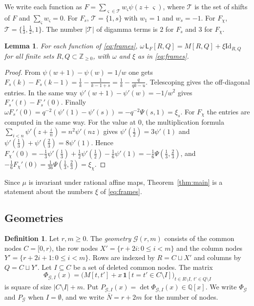 \documentclass[11pt]{amsart}
\newtheorem{lemma}[theorem]{Lemma}
\theoremstyle{definition}
\newtheorem{definition}[theorem]{Definition}
\theoremstyle{remark}
\numberwithin{equation}{section}
\newcommand{\Z}{\mathbb Z}
\newcommand{\Q}{\mathbb Q}
\newcommand{\Lw}{\mathsf L}          %
\newcommand{\Id}{\mathrm{Id}}
\begin{document}
We write each function as $F=\sum_{\varsigma\in\mathcal T}w_\varsigma\psi(z+\varsigma)$, where $\mathcal T$ is the set of
shifts of $F$ and $\sum_\varsigma w_\varsigma=0$. For $F_s$, $\mathcal T=\{1,s\}$ with $w_1=1$ and $w_s=-1$. For
$F_\chi$, $\mathcal T=\{\frac13,\frac12,1\}$. The number $|\mathcal T|$ of digamma terms is $2$ for $F_s$ and $3$ for
$F_\chi$.

\begin{lemma}\label{lem:loewner}
For each function of \eqref{eq:frames}, $\omega\,\Lw_F[R,Q]=M[R,Q]+\xi\Id_{R,Q}$ for all finite sets
$R,Q\subset\Z_{\ge0}$, with $\omega$ and $\xi$ as in \eqref{eq:frames}.
\end{lemma}
\begin{proof}
From $\psi(w+1)-\psi(w)=1/w$ one gets $F_s(k)-F_s(k-1)=\frac1k-\frac1{k-1+s}=\frac1k-\frac q{qk-u}$. Telescoping gives the
off-diagonal entries. In the same way $\psi'(w+1)-\psi'(w)=-1/w^2$ gives $F_s'(t)-F_s'(0)$. Finally
$\omega F_s'(0)=q^{-2}(\psi'(1)-\psi'(s))=-q^{-2}\Psi(s,1)=\xi_s$. For $F_\chi$ the entries are computed in the same way.
For the value at $0$, the multiplication formula $\sum_{i<n}\psi'(z+\frac in)=n^2\psi'(nz)$ gives
$\psi'(\frac12)=3\psi'(1)$ and $\psi'(\frac13)+\psi'(\frac23)=8\psi'(1)$. Hence
$F_\chi'(0)=-\frac13\psi'(\frac13)+\frac12\psi'(\frac12)-\frac16\psi'(1)=-\frac16\Psi(\frac13,\frac23)$, and
$-\frac16F_\chi'(0)=\frac1{36}\Psi(\frac13,\frac23)=\xi_\chi$.
\end{proof}

Since $\mu$ is invariant under rational affine maps, Theorem~\ref{thm:main} is a statement about the numbers $\xi$ of
\eqref{eq:frames}.

\subsection{Geometries}
\begin{definition}\label{def:geometry}
Let $r,m\ge0$. The \emph{geometry} $\mathcal G(r,m)$ consists of the common nodes $C=[0,r)$, the row nodes
$X'=\{r+2i:0\le i<m\}$ and the column nodes $Y'=\{r+2i+1:0\le i<m\}$. Rows are indexed by $R=C\sqcup X'$ and columns by
$Q=C\sqcup Y'$. Let $I\subseteq C$ be a set of deleted common nodes. The matrix
\[
 \Phi_{\mathcal G,I}(x)=\bigl(M[t,t']+x\,\mathbf 1[t=t'\in C\setminus I]\bigr)_{t\in R\setminus I,\ t'\in Q\setminus I}
\]
is square of size $|C\setminus I|+m$. Put $P_{\mathcal G,I}(x)=\det\Phi_{\mathcal G,I}(x)\in\Q[x]$. We write
$\Phi_{\mathcal G}$ and $P_{\mathcal G}$ when $I=\emptyset$, and we write $\bar N=r+2m$ for the number of nodes.
\end{definition}
\end{document}
